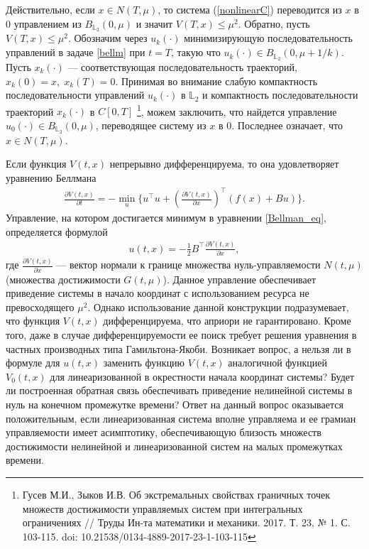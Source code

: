 \documentclass[../main.tex]{subfiles}
\begin{document}
	Действительно, если $ x\in N(T,\mu) $, то система (\ref{nonlinearC}) переводится из $x$ в $0$ управлением из $B_{\mathbb{L}_2}(0,\mu)$ и значит  $V(T,x) \leqslant \mu^2$. Обратно,
	пусть $V(T,x) \leqslant \mu^2$. 
	Обозначим через $u_k(\cdot)$ минимизирующую последовательность управлений в задаче \eqref{bellm} при $t=T$, такую что  $u_k(\cdot) \in B_{\mathbb{L}_2}(0,\mu+1/k)$. Пусть $x_k(\cdot)$ --- соответствующая последовательность траекторий, $x_k(0)=x,\;x_k(T)=0$. Принимая во внимание слабую компактность последовательности управлений   $u_k(\cdot)$ в $\mathbb{L}_2$ и компактность последовательности траекторий  $x_k(\cdot)$ в $ C[0,T]$ \footnote{Гусев М.И., Зыков И.В.  Об экстремальных свойствах граничных точек множеств достижимости управляемых систем при интегральных ограничениях  // Труды Ин-та математики и механики. 2017. Т. 23, № 1. С. 103-115. doi: 10.21538/0134-4889-2017-23-1-103-115}, можем заключить, что найдется управление  $u_0(\cdot)\in B_{\mathbb{L}_2}(0,\mu)$, переводящее систему из $x$ в $0$. Последнее означает, что $x \in 	N(T,\mu)$. 
	
	Если функция $V(t,x)$ непрерывно дифференцируема, то она  удовлетворяет уравнению Беллмана
	\begin{gather}\label{Bellman_eq}
		\frac{\partial V(t,x)}{\partial t} = -\min\limits_{u} \{u^{\top} u + \left(\frac{\partial V(t,x)}{\partial x}\right)^{\top} \left(f(x)+B u\right) \}.
	\end{gather}
	Управление, на котором достигается минимум в уравнении \eqref{Bellman_eq}, определяется формулой
	\begin{gather}\label{feedback}
		u(t,x) = -\frac{1}{2} B^{\top}\frac{\partial V(t,x)}{\partial x},
	\end{gather}
	где $\frac{\partial V(t,x)}{\partial x}$ --- вектор нормали к границе множества нуль-управляемости $N(t,\mu)$ (множества достижимости $G(t,\mu)$). Данное управление обеспечивает приведение системы в начало координат с использованием ресурса не превосходящего $\mu^2$. Однако использование данной конструкции подразумевает, что функция $V(t,x)$ дифференцируема, что априори не гарантировано. Кроме того, даже в случае  дифференцируемости ее поиск требует решения уравнения в частных производных типа Гамильтона-Якоби. Возникает вопрос, а нельзя ли в формуле для $u(t,x)$ заменить функцию $V(t,x)$ аналогичной функцией $V_0(t,x)$ для линеаризованной в окрестности начала координат системы? Будет ли построенная обратная связь обеспечивать приведение нелинейной системы в нуль на конечном промежутке времени?  Ответ на данный вопрос оказывается положительным, если линеаризованная система вполне управляема и ее грамиан управляемости имеет асимптотику, обеспечивающую близость множеств достижимости нелинейной и линеаризованной систем на малых промежутках времени.
\end{document}
